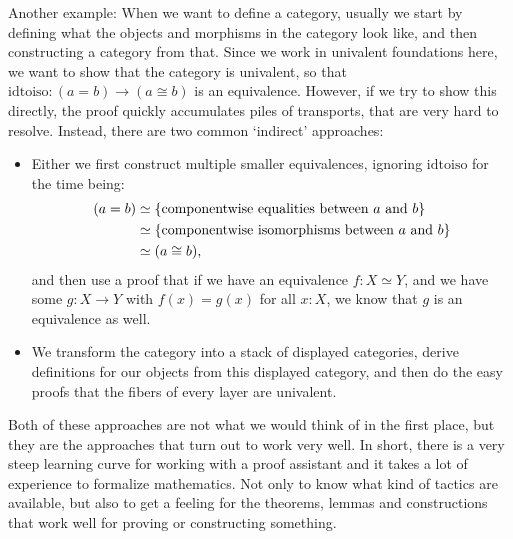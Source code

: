 Another example: When we want to define a category, usually we start by defining what the objects and morphisms in the category look like, and then constructing a category from that. Since we work in univalent foundations here, we want to show that the category is univalent, so that $ \mathrm{idtoiso}: (a = b) \to (a \cong b) $ is an equivalence. However, if we try to show this directly, the proof quickly accumulates piles of transports, that are very hard to resolve. Instead, there are two common `indirect' approaches:
\begin{itemize}
  \item Either we first construct multiple smaller equivalences, ignoring $ \mathrm{idtoiso} $ for the time being:
    \begin{align*}
      (a = b) &\simeq \{ \text{componentwise equalities between $ a $ and $ b $} \}\\
      &\simeq \{ \text{componentwise isomorphisms between $ a $ and $ b $} \}\\
      &\simeq (a \cong b),
    \end{align*}
    and then use a proof that if we have an equivalence $ f: X \simeq Y $, and we have some $ g : X \to Y $ with $ f(x) = g(x) $ for all $ x : X $, we know that $ g $ is an equivalence as well.
  \item We transform the category into a stack of displayed categories, derive definitions for our objects from this displayed category, and then do the easy proofs that the fibers of every layer are univalent.
\end{itemize}
Both of these approaches are not what we would think of in the first place, but they are the approaches that turn out to work very well. In short, there is a very steep learning curve for working with a proof assistant and it takes a lot of experience to formalize mathematics. Not only to know what kind of tactics are available, but also to get a feeling for the theorems, lemmas and constructions that work well for proving or constructing something.

